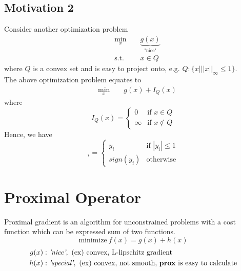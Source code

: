 \documentclass[12pt]{report}
\begin{document}
\subsection{Motivation 2}
Consider another optimization problem
\begin{equation}
\begin{aligned}
    &  \underset{x}{\text{ min }}
    && \underbrace{g(x)}_{\text{"nice"}} \\
    &  \text{ s.t. } 
    && x \in Q
\end{aligned}
\end{equation}
where $Q$ is a convex set and is easy to project onto, e.g. $Q: \{ x| ||x||_{\infty} \leq 1 \}$. \\
The above optimization problem equates to 
\begin{equation}
\begin{aligned}
    &  \underset{x}{\text{ min }}
    && g(x) + I_Q(x) 
\end{aligned}
\end{equation}
where 
\begin{equation}
    I_Q (x) = 
   \begin{cases}
   0 &\mbox{if } x \in Q  \\
   \infty &\mbox{if } x \not \in Q
   \end{cases}
  \end{equation}
Hence, we have 
\begin{equation}
    [P_Q(y)]_i =
   \begin{cases}
   y_i &\mbox{if } |y_i| \leq 1  \\
   sign(y_i) &\mbox{otherwise} 
   \end{cases}
  \end{equation}
  
\section{Proximal Operator} \label{PGA_OPERATOR}
Proximal gradient is an algorithm for unconstrained problems with a cost function which can be expressed sum of two functions.
\begin{equation}
\textrm{minimize}~f(x)=g(x)+h(x)
\end{equation}
\vspace{-2.5em}
\begin{align*}
g(x)&: \textit{'nice'}, \text{ (ex) convex, L-lipschitz gradient}\\
h(x)&: \textit{'special'}, \text{ (ex) convex, not smooth, \textbf{prox} is easy to calculate}
\end{align*}
\end{document}
